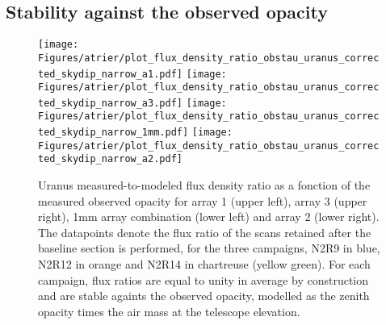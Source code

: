 \subsection{Stability against the observed opacity}


\begin{figure}[ht!]
  \begin{center}
    \texttt{[image: Figures/atrier/plot\_flux\_density\_ratio\_obstau\_uranus\_corrected\_skydip\_narrow\_a1.pdf]}
    \texttt{[image: Figures/atrier/plot\_flux\_density\_ratio\_obstau\_uranus\_corrected\_skydip\_narrow\_a3.pdf]}
    \texttt{[image: Figures/atrier/plot\_flux\_density\_ratio\_obstau\_uranus\_corrected\_skydip\_narrow\_1mm.pdf]}
    \texttt{[image: Figures/atrier/plot\_flux\_density\_ratio\_obstau\_uranus\_corrected\_skydip\_narrow\_a2.pdf]}
    \caption[Uranus flux density stability against observed
  opacity]{Uranus measured-to-modeled flux density ratio as a fonction
  of the measured observed opacity for array 1 (upper left), array 3
  (upper right), 1mm array combination (lower left) and array 2 (lower
  right). The datapoints denote the flux ratio of the scans retained after the
  baseline section is performed, for the three campaigns, N2R9
  in blue, N2R12 in orange and N2R14 in chartreuse (yellow green). For
  each campaign, flux ratios are equal to unity in average by
  construction and are stable againts the observed opacity, modelled as
  the zenith opacity times the air mass at the telescope elevation.}
\label{fig:uranus_flux_obstau}
\end{center}
\end{figure}
